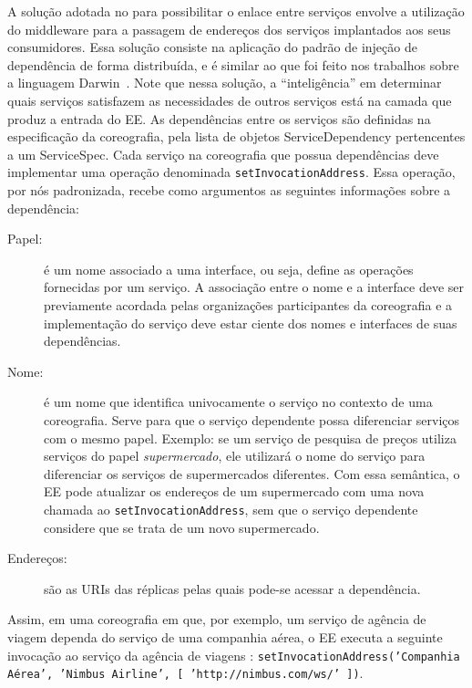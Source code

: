 A solução adotada no \ee para possibilitar o enlace entre serviços envolve a utilização do middleware para a passagem de endereços dos serviços implantados aos seus consumidores. Essa solução consiste na aplicação do padrão de injeção de dependência de forma distribuída, e é similar ao que foi feito nos trabalhos sobre a linguagem Darwin~\cite{Magee1996Dynamic, Magee1994Regis}. 
Note que nessa solução, a ``inteligência'' em determinar quais serviços satisfazem as necessidades de outros serviços está na camada que produz a entrada do EE.
As dependências entre os serviços são definidas na especificação da coreografia,
pela lista de objetos \textsf{ServiceDependency} pertencentes a um \textsf{ServiceSpec}.
Cada serviço na coreografia que possua dependências deve implementar uma operação denominada \texttt{setInvocationAddress}. 
Essa operação, por nós padronizada, recebe como argumentos as seguintes informações sobre a dependência: 

\begin{description}

\item [Papel:] é um nome associado a uma interface, ou seja, define as operações fornecidas por um serviço. A associação entre o nome e 
a interface deve ser previamente acordada pelas organizações participantes da coreografia e a implementação do serviço
deve estar ciente dos nomes e interfaces de suas dependências.

\item [Nome:] é um nome que identifica univocamente o serviço no contexto de uma coreografia. Serve para que o serviço dependente possa 
diferenciar serviços com o mesmo papel. Exemplo: se um serviço de pesquisa de preços utiliza serviços do papel \emph{supermercado},
ele utilizará o nome do serviço para diferenciar os serviços de supermercados diferentes. Com essa semântica, o EE pode atualizar
os endereços de um supermercado com uma nova chamada ao \texttt{setInvocationAddress}, sem que o serviço dependente considere
que se trata de um novo supermercado.

\item [Endereços:] são as URIs das réplicas pelas quais pode-se acessar a dependência.

\end{description}

Assim, em uma coreografia em que, por exemplo, um serviço de agência de viagem dependa do serviço de uma companhia aérea, o EE executa a seguinte invocação ao serviço da agência de viagens : \texttt{setInvocationAddress('Companhia Aérea', 'Nimbus Airline', [ 'http://nimbus.com/ws/' ])}. 

